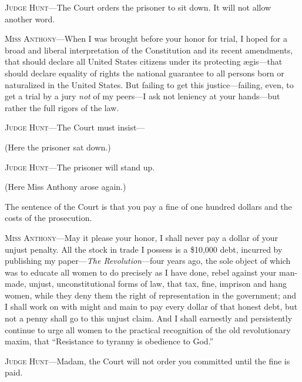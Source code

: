 \textsc{Judge Hunt}---The Court orders the prisoner to sit down. It
will not allow another word.

\textsc{Miss Anthony}---When I was brought before your honor for
trial, I hoped for a broad and liberal interpretation of the
Constitution and its recent amendments, that should declare all United
States citizens under its protecting {\ae}gis---that should declare
equality of rights the national guarantee to all persons born or
naturalized in the United States. But failing to get this
justice---failing, even, to get a trial by a jury \textit{not} of my
peers---I ask not leniency at your hands---but rather the full rigors
of the law.

\textsc{Judge Hunt}---The Court must insist---

(Here the prisoner sat down.)

\textsc{Judge Hunt}---The prisoner will stand up.

(Here Miss Anthony arose again.)

The sentence of the Court is that you pay a fine of one hundred
dollars and the costs of the prosecution.

\textsc{Miss Anthony}---May it please your honor, I shall never pay a
dollar of your unjust penalty. All the stock in trade I possess is a
\$10,000 debt, incurred by publishing my paper---\textit{The
Revolution}---four years ago, the sole object of which was to educate
all women to  do precisely as I have done, rebel against your
man-made, unjust, unconstitutional forms of law, that tax, fine,
imprison and hang women, while they deny them the right of
representation in the government; and I shall work on with might and
main to pay every dollar of that honest debt, but not a penny shall go
to this unjust claim. And I shall earnestly and persistently continue
to urge all women to the practical recognition of the old
revolutionary maxim, that ``Resistance to tyranny is obedience to
God.''

\textsc{Judge Hunt}---Madam, the Court will not order you committed
until the fine is paid.

